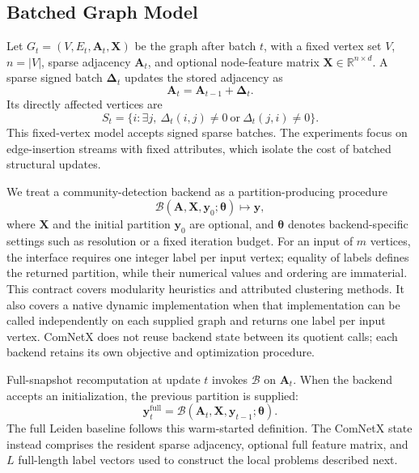 \documentclass{ieeeaccess}
\begin{document}
\subsection{Batched Graph Model}

Let $G_t=(V,E_t,\bm{A}_t,\bm{X})$ be the graph after batch $t$, with a fixed
vertex set $V$, $n=|V|$, sparse adjacency $\bm{A}_t$, and optional node-feature
matrix $\bm{X}\in\mathbb{R}^{n\times d}$. A sparse signed batch $\bm{\Delta}_t$
updates the stored adjacency as
\begin{equation}
\bm{A}_t=\bm{A}_{t-1}+\bm{\Delta}_t.
\label{eq:update}
\end{equation}
Its directly affected vertices are
\begin{equation}
S_t=\{i:\exists j,\ \Delta_t(i,j)\ne0\ \text{or}\
\Delta_t(j,i)\ne0\}.
\label{eq:affected}
\end{equation}
This fixed-vertex model accepts signed sparse batches. The experiments focus on
edge-insertion streams with fixed attributes, which isolate the cost of batched
structural updates.

We treat a community-detection backend as a partition-producing procedure
\begin{equation}
\mathcal{B}(\bm{A},\bm{X},\bm{y}_0;\bm{\theta})\longmapsto\bm{y},
\label{eq:backend}
\end{equation}
where $\bm{X}$ and the initial partition $\bm{y}_0$ are optional, and
$\bm{\theta}$ denotes backend-specific settings such as resolution or a fixed
iteration budget. For an input of $m$ vertices, the interface requires one
integer label per input vertex; equality of labels defines the returned
partition, while their numerical values and ordering are immaterial. This
contract covers modularity heuristics and attributed clustering methods. It
also covers a native dynamic implementation when that implementation can be
called independently on each supplied graph and returns one label per input
vertex. ComNetX does not reuse backend state between its quotient calls; each
backend retains its own objective and optimization procedure.

Full-snapshot recomputation at update $t$ invokes $\mathcal{B}$ on $\bm{A}_t$.
When the backend accepts an initialization, the previous partition is supplied:
\begin{equation}
\bm{y}^{\mathrm{full}}_t=
\mathcal{B}(\bm{A}_t,\bm{X},\bm{y}_{t-1};\bm{\theta}).
\label{eq:full_backend}
\end{equation}
The full Leiden baseline follows this warm-started definition. The
ComNetX state instead comprises the resident sparse adjacency, optional full
feature matrix, and $L$ full-length label vectors used to construct the local
problems described next.
\end{document}
